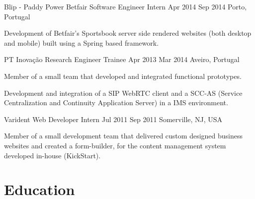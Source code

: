 \documentclass[]{andre-vechina-resume}
\begin{document}
\begin{experience-item}
    {Blip - Paddy Power Betfair}
    {Software Engineer Intern}
    {Apr 2014}
    {Sep 2014}
    {Porto, Portugal}

    \begin{tightemize}
        \item
        Development of Betfair's Sportsbook server side rendered websites (both desktop and mobile) built using a Spring based framework.
    \end{tightemize}

\end{experience-item}

\begin{experience-item}
    {PT Inovação}
    {Research Engineer Trainee}
    {Apr 2013}
    {Mar 2014}
    {Aveiro, Portugal}
    \begin{tightemize}
        \item
        Member of a small team that developed and integrated functional prototypes.
        \item
        Development and integration of a SIP WebRTC client and a SCC-AS (Service Centralization and Continuity Application Server) in a IMS environment.
    \end{tightemize}

\end{experience-item}

\begin{experience-item}
    {Varident}
    {Web Developer Intern}
    {Jul 2011}
    {Sep 2011}
    {Somerville, NJ, USA}
    \begin{tightemize}
        \item
        Member of a small development team that delivered custom designed business websites and created a form-builder, for the content management system developed in-house (KickStart).
    \end{tightemize}

\end{experience-item}

\section{Education}
\end{document}
